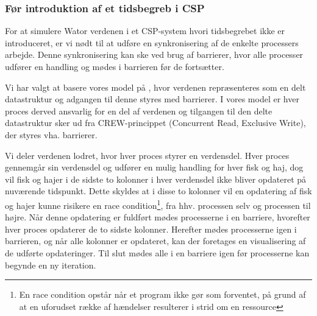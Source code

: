 \subsubsection*{Før introduktion af et tidsbegreb i CSP} For at simulere Wator 
verdenen i et CSP-system hvori tidsbegrebet ikke er introduceret, er vi nødt 
til at udføre en synkronisering af de enkelte processers arbejde. Denne 
synkronisering kan ske ved brug af barrierer, hvor alle processer udfører en 
handling og mødes i barrieren før de fortsætter.

Vi har valgt at basere vores model på \cite{crew}, hvor verdenen repræsenteres 
som en delt datastruktur og adgangen til denne styres med barrierer. I vores 
model er hver proces derved ansvarlig for en del af verdenen og tilgangen til 
den delte datastruktur sker ud fra CREW-princippet (Concurrent Read, Exclusive 
Write)\cite[5]{crew}, der styres vha. barrierer. 

Vi deler verdenen lodret, hvor hver proces styrer en verdensdel. Hver proces 
gennemgår sin verdensdel og udfører en mulig handling for hver fisk og haj, dog 
vil fisk og hajer i de sidste to kolonner i hver verdensdel ikke bliver 
opdateret på nuværende tidspunkt. Dette skyldes at i disse to kolonner vil en 
opdatering af fisk og hajer kunne risikere en race 
condition\footnote{En race condition opstår når et program ikke gør som 
forventet, på grund af at en uforudset række af hændelser resulterer i strid om 
en ressource}, fra hhv.  processen selv og processen til højre.
 Når denne opdatering er fuldført mødes processerne i en barriere, hvorefter 
 hver proces opdaterer de to sidste kolonner. Herefter mødes processerne igen i 
 barrieren, og når alle kolonner er opdateret, kan der foretages en 
 visualisering af de udførte opdateringer. Til slut mødes alle i en barriere 
 igen før processerne kan begynde en ny iteration.

